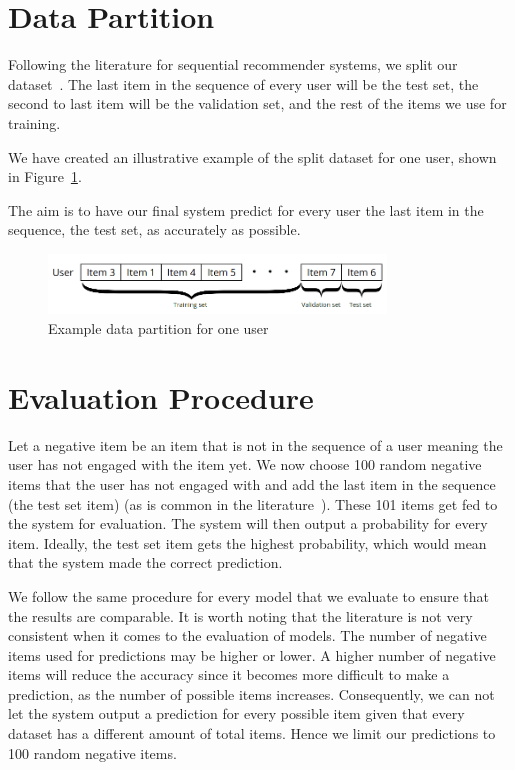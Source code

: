 \section{Data Partition}
\label{sec:data_partition}
Following the literature for sequential recommender systems, we split our dataset~\cite{kang2018self, sun2019bert4rec}. The last item in the sequence of every user will be the test set, the second to last item will be the validation set, and the rest of the items we use for training.

We have created an illustrative example of the split dataset for one user, shown in Figure~\ref{fig:datasplit}.

The aim is to have our final system predict for every user the last item in the sequence, the test set, as accurately as possible.

\begin{figure}[htbp]
\centering
\includegraphics[width=0.8\textwidth]{images/illustrations/datasplit.png}
\caption{Example data partition for one user}
\label{fig:datasplit}
\end{figure}


\section{Evaluation Procedure}
\label{sec:test_procedure}
Let a negative item be an item that is not in the sequence of a user meaning the user has not engaged with the item yet. We now choose 100 random negative items that the user has not engaged with and
add the last item in the sequence (the test set item) (as is common in the literature~\cite{ying2018graph}). These 101 items get fed to the system for evaluation. The system will then output a probability for every item. Ideally, the test set item gets the highest probability, which would mean that the system made the correct prediction.

We follow the same procedure for every model that we evaluate to ensure that the results are comparable. It is worth noting that the literature is not very consistent when it comes to the evaluation of models. The number of negative items used for predictions may be higher or lower. A higher number of negative items will reduce the accuracy since it becomes more difficult to make a prediction, as the number of possible items increases. Consequently, we can not let the system output a prediction for every possible item given that every dataset has a different amount of total items. Hence we limit our predictions to 100 random negative items.


